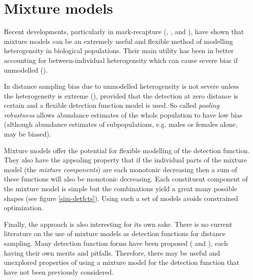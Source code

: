 \section{Mixture models}

Recent developments, particularly in mark-recapture (\cite{pledger2000}, \cite{dorazio03}, \cite{pledger2005} and \cite{morgan08}), have shown that mixture models can be an extremely useful and flexible method of modelling heterogeneity in biological populations. Their main utility has been in better accounting for between-individual heterogeneity which can cause severe bias if unmodelled (\cite{Link2003}). 

In distance sampling bias due to unmodelled heterogeneity is not severe unless the heterogeneity is extreme (\cite[pp. 389-392]{ADS}), provided that the detection at zero distance is certain and a flexible detection function model is used. So called \textit{pooling robustness} allows abundance estimates of the whole population to have low bias (although abundance estimates of subpopulations, e.g. males or females alone, may be biased). 

Mixture models offer the potential for flexible modelling of the detection function. They also have the appealing property that if the individual parts of the mixture model (the \textit{mixture components}) are each monotonic decreasing then a sum of these functions will also be monotonic decreasing. Each constituent component of the mixture model is simple but the combinations yield a great many possible shapes (see figure \ref{sim-detfcts}). Using such a set of models avoids constrained optimization.


Finally, the approach is also interesting for its own sake. There is no current literature on the use of mixture models as detection functions for distance sampling. Many detection function forms have been proposed (\cite{buckland92} and  \cite{gammadetfct}), each having their own merits and pitfalls. Therefore, there may be useful and unexplored properties of using a mixture model for the detection function that have not been previously considered.

